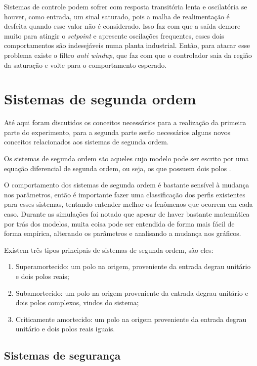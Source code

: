 \documentclass[
	12pt,				%
	openany,			%
	oneside,			%
	a4paper,			%
	english,			%
	french,				%
	spanish,			%
	brazil,				%
	]{abntex2}
\begin{document}
{Sistemas de controle podem sofrer com resposta transitória lenta e oscilatória se houver, como entrada, um sinal saturado, pois a malha de realimentação é desfeita quando esse valor não é considerado. Isso faz com que a saída demore muito para atingir o \textit{setpoint} e apresente oscilações frequentes, esses dois comportamentos são indesejáveis numa planta industrial. Então, para atacar esse problema existe o filtro \textit{anti windup}, que faz com que o controlador saia da região da saturação e volte para o comportamento esperado.

\section{Sistemas de segunda ordem}

Até aqui foram discutidos os conceitos necessários para a realização da primeira parte do experimento, para a segunda parte serão necessários alguns novos conceitos relacionados aos sistemas de segunda ordem. 

Os sistemas de segunda ordem são aqueles cujo modelo pode ser escrito por uma equação diferencial de segunda ordem, ou seja, os que possuem dois polos \cite{dan_madeira}.

O comportamento dos sistemas de segunda ordem é bastante sensível à mudança nos parâmetros, então é importante fazer uma classificação dos perfis existentes para esses sistemas, tentando entender melhor os fenômenos que ocorrem em cada caso. Durante as simulações foi notado que apesar de haver bastante matemática por trás dos modelos, muita coisa pode ser entendida de forma mais fácil de forma empírica, alterando os parâmetros e analisando a mudança nos gráficos.

Existem três tipos principais de sistemas de segunda ordem, são eles:
\begin{enumerate}
	\item Superamortecido: um polo na origem, proveniente da entrada degrau unitário e dois polos reais;
	
	\item Subamortecido: um polo na origem proveniente da entrada degrau unitário e dois polos complexos, vindos do sistema;
	
	\item Criticamente amortecido: um polo na origem proveniente da entrada degrau unitário e dois polos reais iguais.		
\end{enumerate}

\subsection{Sistemas de segurança}

}
\end{document}
